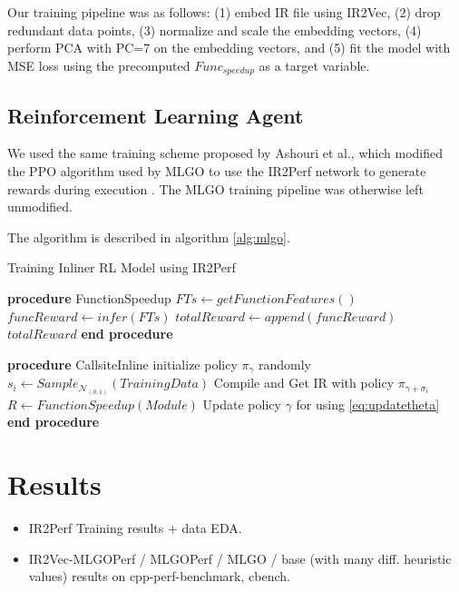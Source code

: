 \documentclass[nohyperref]{article}
\theoremstyle{plain}
\theoremstyle{definition}
\theoremstyle{remark}
\begin{document}
Our training pipeline was as follows: (1) embed IR file using IR2Vec, (2) drop redundant data points, (3) normalize and scale the embedding vectors, (4) perform PCA with PC=7 on the embedding vectors, and (5) fit the model with MSE loss using the precomputed $Func_{speedup}$ as a target variable.

\subsection{Reinforcement Learning Agent}

We used the same training scheme proposed by Ashouri et al., which modified the PPO algorithm used by MLGO to use the IR2Perf network to generate rewards during execution \cite{mlgoperf}. The MLGO training pipeline was otherwise left unmodified.

The algorithm is described in algorithm \ref{alg:mlgo}.

\begin{algorithm}
    \caption{Training Inliner RL Model using IR2Perf}
    \label{alg:mlgo}
\begin{algorithmic}
    \STATE \textbf{procedure} FunctionSpeedup
       \STATE $FTs \leftarrow getFunctionFeatures()$
       \STATE $funcReward \leftarrow infer(FTs)$
       \STATE $totalReward \leftarrow append(funcReward)$
       \ENDFOR
       \RETURN $totalReward$
    \STATE \textbf{end procedure}
\end{algorithmic}
\;
\;
\begin{algorithmic}
    \STATE \textbf{procedure} CallsiteInline
        \STATE initialize policy $\pi_{\gamma}$ randomly
        \STATE $s_i \leftarrow Sample_{\mathcal{N}_{(0,1)}}(TrainingData)$
        \STATE Compile and Get IR with policy $\pi_{\gamma + \sigma_i}$
        \STATE $R \leftarrow FunctionSpeedup(Module)$
        \STATE Update policy $\gamma$ for using \ref{eq:updatetheta}
        \ENDFOR
    \STATE \textbf{end procedure}
\end{algorithmic}
\end{algorithm}

\section{Results}
\label{results}
\begin{itemize}
\item IR2Perf Training results + data EDA\@.
\item IR2Vec-MLGOPerf / MLGOPerf / MLGO / base (with many diff. heuristic values) results on cpp-perf-benchmark, cbench\@.
\end{itemize}
\end{document}
